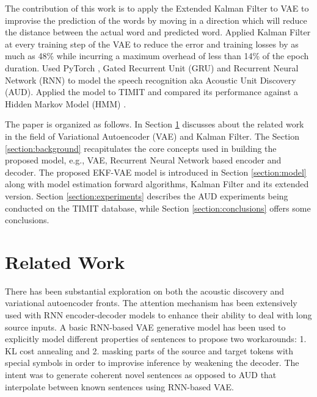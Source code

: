 \documentclass{article}
\begin{document}
\par
The contribution of this work is to apply the Extended Kalman Filter \cite{ekf_2002} to VAE to improvise the prediction of the words by moving in a direction which will reduce the distance between the actual word and predicted word. Applied Kalman Filter at every training step of the VAE to reduce the error and training losses by as much as 48\% while incurring a maximum overhead of less than 14\% of the epoch duration. Used PyTorch \cite{paszke2017automatic},\cite{NEURIPS2019_9015} Gated Recurrent Unit (GRU) and Recurrent Neural Network (RNN) \cite{SchusterP97} to model the speech recognition aka Acoustic Unit Discovery (AUD). Applied the model to TIMIT \cite{timit-article} and compared its performance against a Hidden Markov Model (HMM) \cite{Raj_2017}.

\par
The paper is organized as follows. In Section \ref{section:related} discusses about the related work in the field of Variational Autoencoder (VAE) and Kalman Filter. The Section \ref{section:background} recapitulates the core concepts used in building the proposed model, e.g., VAE, Recurrent Neural Network based encoder and decoder. The proposed EKF-VAE model is introduced in Section \ref{section:model} along with model estimation forward algorithms, Kalman Filter and its extended version. Section \ref{section:experiments} describes the AUD experiments being conducted on the TIMIT \cite{timit-article} database, while Section \ref{section:conclusions} offers some conclusions.  

\section{Related Work}
\label{section:related}
There has been substantial exploration on both the acoustic discovery and variational autoencoder fronts.
The attention mechanism \cite{bahdanau2016neural} has been extensively used with RNN encoder-decoder models \cite{wang2016learning} to enhance their ability to deal with long source inputs. A basic RNN-based VAE \cite{bowman2016generating} generative model has been used to explicitly model different properties of sentences to propose two workarounds: 1. KL cost annealing and 2. masking parts of the source and target tokens with special symbols in order to improvise inference by weakening the decoder. The intent was to generate coherent novel sentences as opposed to AUD that interpolate between known sentences using RNN-based VAE.
\end{document}
